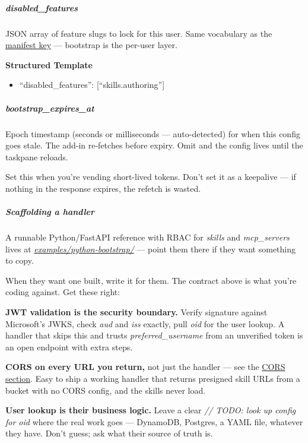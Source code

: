 \documentclass[11pt]{article}
\begin{document}
\subparagraph{\emph{disabled\_\allowbreak{}features}}\mbox{}\par

JSON array of feature slugs to lock for this user. Same vocabulary as the \href{manifest.md\#disabled-features}{manifest key} — bootstrap is the per-user layer.


\textbf{Structured Template}
\begin{itemize}[leftmargin=*,itemsep=2pt,topsep=2pt]
\item {} ``disabled\_\allowbreak{}features'': [``skills.authoring'']
\end{itemize}

\subparagraph{\emph{bootstrap\_\allowbreak{}expires\_\allowbreak{}at}}\mbox{}\par

Epoch timestamp (seconds or milliseconds — auto-detected) for when this config goes stale. The add-in re-fetches before expiry. Omit and the config lives until the taskpane reloads.


Set this when you're vending short-lived tokens. Don't set it as a keepalive — if nothing in the response expires, the refetch is wasted.


\subparagraph{Scaffolding a handler}\mbox{}\par

A runnable Python/FastAPI reference with RBAC for \emph{skills} and \emph{mcp\_\allowbreak{}servers} lives at \href{../examples/python-bootstrap/}{\emph{examples/python-bootstrap/}} — point them there if they want something to copy.


When they want one built, write it for them. The contract above is what you're coding against. Get these right:


\textbf{JWT validation is the security boundary.} Verify signature against Microsoft's JWKS, check \emph{aud} and \emph{iss} exactly, pull \emph{oid} for the user lookup. A handler that skips this and trusts \emph{preferred\_\allowbreak{}username} from an unverified token is an open endpoint with extra steps.


\textbf{CORS on every URL you return,} not just the handler — see the \href{\#cors--every-url-needs-it}{CORS section}. Easy to ship a working handler that returns presigned skill URLs from a bucket with no CORS config, and the skills never load.


\textbf{User lookup is their business logic.} Leave a clear \emph{// TODO: look up config for oid} where the real work goes — DynamoDB, Postgres, a YAML file, whatever they have. Don't guess; ask what their source of truth is.
\end{document}
